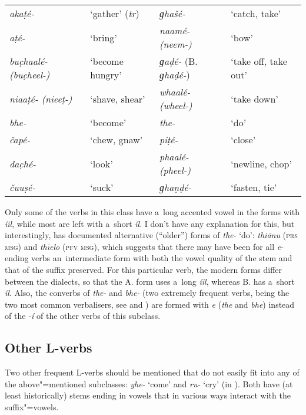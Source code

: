 \begin{table}[H]
\begin{tabularx}{\textwidth}{ Q Q Q Q }
\textit{akaṭé-} &
`gather' (\textit{tr}) &
\textit{ɡhašé-} &
`catch, take'\\
\textit{aṭé-} &
`bring' &
\textit{naamé- (neem-)} &
`bow'\\
\textit{buc̣haalé- (buc̣heel-)} &
`become hungry' &
\textit{ɡaḍé-} (B. \textit{ɡhaḍé-}) &
`take off, take out'\\
\textit{niaaṭé- (nieeṭ-)} &
`shave, shear' &
\textit{whaalé- (wheel-)} &
`take down'\\
\textit{bhe-} &
`become' &
\textit{the-} &
`do'\\
\textit{čapé-} &
`chew, gnaw' &
\textit{piṭé-} &
`close'\\
\textit{dac̣hé-} &
`look' &
\textit{phaalé- (pheel-)} &
`newline, chop'\\
\textit{čuuṣé-} &
`suck' &
\textit{ɡhaṇḍé-} &
`fasten, tie' \\
\end{tabularx}
\end{table}


Only some of the verbs in this class have a~long accented vowel in the  forms with
\textit{íil}, while most are left with a~short \textit{íl}. I don't have any explanation for
this, but interestingly, \citet[22--23]{morgenstierne1941} has documented alternative (``older'')
forms of \textit{the-} `do': \textit{thiānu} (\textsc{prs msg}) and \textit{thīelo}
(\textsc{pfv msg}), which suggests that there may have been for all \textit{e}-ending verbs
an~intermediate form with both the vowel quality of the stem and that of the suffix preserved. For
this particular verb, the modern  forms differ between the dialects, so that the A. form
uses a~long \textit{íil}, whereas B. has a~short \textit{íl}. Also, the converbs of
\textit{the-} and \textit{bhe-} (two extremely frequent verbs, being the two most common
verbalisers, see  and ) are formed with \textit{e}
(\textit{the} and \textit{bhe}) instead of the \textit{-í} of the other verbs of this subclass.


\subsection{Other L-verbs}
\label{subsec:8-3-4}


Two other frequent L-verbs should be mentioned that do not easily fit into any of the above"=mentioned subclasses: \textit{yhe-} `come' and \textit{ru-} `cry' (in ). Both have (at least historically) stems ending in vowels that in various ways interact with the suffix"=vowels. 


